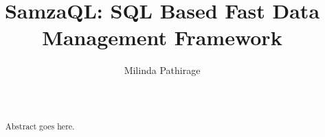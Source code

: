 \documentclass{sig-alternate}
\begin{document}
%

\title{SamzaQL: SQL Based Fast Data Management Framework}


\author{
\alignauthor
Milinda Pathirage\\
       \\
       \\
}

\maketitle
\begin{abstract}
  Abstract goes here. 
\end{abstract}
\end{document}
